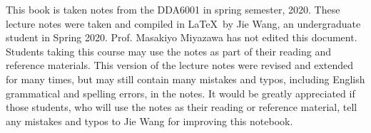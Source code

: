 

%
%

%


\acknowledgments
This book is taken notes from the DDA6001 in spring semester, 2020. These lecture notes were taken and compiled in \LaTeX~by Jie Wang, an undergraduate student in Spring 2020. Prof. Masakiyo Miyazawa has not edited this document. Students taking this course may use the notes as part of their reading and reference materials. This version of the lecture notes were revised and extended for many times, but may still contain many mistakes and typos, including English grammatical and spelling errors, in the notes. It would be greatly appreciated if those students, who will use the notes as their reading or reference material, tell any mistakes and typos to Jie Wang for improving this notebook.




\mainmatter
\setcounter{page}{1}

%

%
%

%



